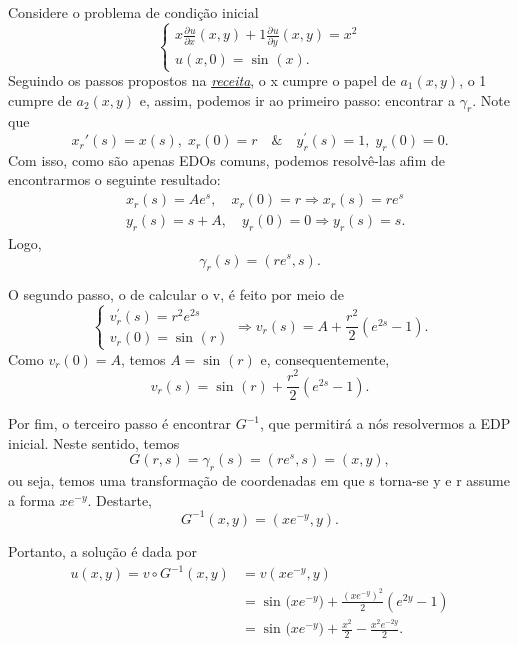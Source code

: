 \documentclass[../pde_notes.tex]{subfiles}
\begin{document}
\begin{example}
	Considere o problema de condição inicial
	\[
		\left\{\begin{array}{ll}
			x \frac{\partial^{}u}{\partial x^{}}(x, y) + 1 \frac{\partial^{}u}{\partial y^{}}(x, y) = x^{2} \\
			u(x, 0) = \sin^{}{(x)}.
		\end{array}\right.
	\]
	Seguindo os passos propostos na \hyperlink{recipe}{\textit{receita}}, o x cumpre o papel de \(a_{1}(x, y)\), o 1 cumpre de \(a_{2}(x, y)\) e, assim, podemos ir ao primeiro passo: encontrar a \(\gamma_{r}\). Note que
	\[
		x_{r}'(s) = x(s),\; x_{r}(0) = r\quad\&\quad y_{r}^{'}(s) = 1,\; y_{r}(0) = 0.
	\]
	Com isso, como são apenas EDOs comuns, podemos resolvê-las afim de encontrarmos o seguinte resultado:
	\begin{align*}
		 & x_{r}(s) = Ae^{s},\quad x_{r}(0) = r \Rightarrow x_{r}(s) = re^{s} \\
		 & y_{r}(s) = s + A,\quad y_{r}(0) = 0 \Rightarrow y_{r}(s) = s.
	\end{align*}
	Logo,
	\[
		\gamma_{r}(s) = (re^{s}, s).
	\]

	O segundo passo, o de calcular o v, é feito por meio de
	\[
		\left\{\begin{array}{ll}
			v_{r}^{'}(s) = r^{2}e^{2s} \\
			v_{r}(0) = \sin^{}{(r)}
		\end{array}\right.\Rightarrow v_{r}(s) = A + \frac{r^{2}}{2}(e^{2s}-1).
	\]
	Como \(v_{r}(0) = A\), temos \(A = \sin^{}{(r)}\) e, consequentemente,
	\[
		v_{r}(s) = \sin^{}{(r)} + \frac{r^{2}}{2}(e^{2s}-1).
	\]

	Por fim, o terceiro passo é encontrar \(G^{-1}\), que permitirá a nós resolvermos a EDP inicial. Neste sentido, temos
	\[
		G(r, s) = \gamma_{r}(s) = (re^{s}, s) = (x, y),
	\]
	ou seja, temos uma transformação de coordenadas em que s torna-se y e r assume a forma \(xe^{-y}\). Destarte,
	\[
		G^{-1}(x, y) = (xe^{-y}, y).
	\]

	Portanto, a solução é dada por
	\begin{align*}
		u(x, y) = v\circ G^{-1}(x, y) & = v(xe^{-y}, y)                                                            \\
		                              & = \sin^{}{\bigl(xe^{-y}\bigr)} + \frac{(xe^{-y})^{2}}{2}(e^{2y}-1)         \\
		                              & = \sin^{}{\bigl(xe^{-y}\bigr)} + \frac{x^{2}}{2} - \frac{x^{2}e^{-2y}}{2}.
	\end{align*}
\end{example}
\end{document}

